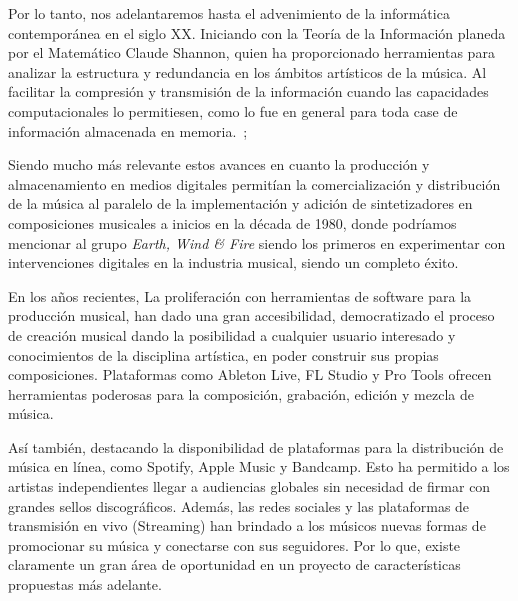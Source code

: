 \documentclass{book}
\begin{document}
	Por lo tanto, nos adelantaremos hasta el advenimiento de la informática contemporánea en el siglo XX. Iniciando con la Teoría de la Información planeda por el Matemático Claude Shannon, quien ha proporcionado herramientas para analizar la estructura y redundancia en los ámbitos artísticos de la música. Al facilitar la compresión y transmisión de la información cuando las capacidades computacionales lo permitiesen, como lo fue en general para toda case de información almacenada en memoria.~\citep{claudeShannon};
	
	Siendo mucho más relevante estos avances en cuanto la producción y almacenamiento en medios digitales permitían la comercialización y distribución de la música al paralelo de la implementación y adición de sintetizadores en composiciones musicales a inicios en la década de 1980, donde podríamos mencionar al grupo \emph{Earth, Wind \& Fire} siendo los primeros en experimentar con intervenciones digitales en la industria musical, siendo un completo éxito.\par
	
	En los años recientes,  La proliferación con herramientas de software para la producción musical, han dado una gran accesibilidad, democratizado el proceso de creación musical dando la posibilidad a cualquier usuario interesado y conocimientos de la disciplina artística, en poder construir sus propias composiciones. Plataformas como Ableton Live, FL Studio y Pro Tools ofrecen herramientas poderosas para la composición, grabación, edición y mezcla de música.~\cite{edadDigital}\par
	
	Así también, destacando la disponibilidad de plataformas para la distribución de música en línea, como Spotify, Apple Music y Bandcamp. Esto ha permitido a los artistas independientes llegar a audiencias globales sin necesidad de firmar con grandes sellos discográficos. Además, las redes sociales y las plataformas de transmisión en vivo (Streaming) han brindado a los músicos nuevas formas de promocionar su música y conectarse con sus seguidores. Por lo que, existe claramente un gran área de oportunidad en un proyecto de características propuestas más adelante.\par
	
\end{document}
